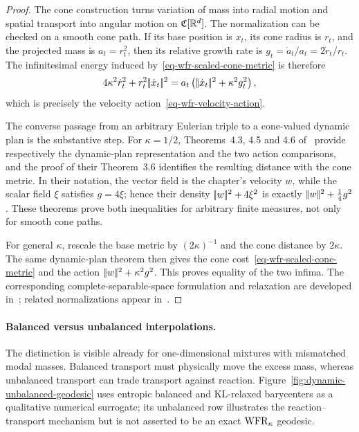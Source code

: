 \begin{proof}
	The cone construction turns variation of mass into radial motion and spatial transport into angular motion on $\mathfrak C[\mathbb{R}^d]$. The normalization can be checked on a smooth cone path. If its base position is $x_t$, its cone radius is $r_t$, and the projected mass is $a_t=r_t^2$, then its relative growth rate is $g_t=\dot a_t/a_t=2\dot r_t/r_t$. The infinitesimal energy induced by~\eqref{eq-wfr-scaled-cone-metric} is therefore
	\[
		4\kappa^2\dot r_t^2+r_t^2|\!| \dot x_t |\!|^2
		=
		a_t\left(|\!| \dot x_t |\!|^2+\kappa^2g_t^2\right),
	\]
		which is precisely the velocity action~\eqref{eq-wfr-velocity-action}.

	The converse passage from an arbitrary Eulerian triple to a cone-valued dynamic plan is the substantive step. For $\kappa=1/2$, Theorems~4.3, 4.5 and 4.6 of~\cite{LieroMielkeSavareShort} provide respectively the dynamic-plan representation and the two action comparisons, and the proof of their Theorem~3.6 identifies the resulting distance with the cone metric. In their notation, the vector field is the chapter's velocity $w$, while the scalar field $\xi$ satisfies $g=4\xi$; hence their density $|\!| w |\!|^2+4\xi^2$ is exactly $|\!| w |\!|^2+\tfrac14g^2$. These theorems prove both inequalities for arbitrary finite measures, not only for smooth cone paths.

	For general $\kappa$, rescale the base metric by $(2\kappa)^{-1}$ and the cone distance by $2\kappa$. The same dynamic-plan theorem then gives the cone cost~\eqref{eq-wfr-scaled-cone-metric} and the action $|\!| w |\!|^2+\kappa^2g^2$. This proves equality of the two infima. The corresponding complete-separable-space formulation and relaxation are developed in~\cite{LieroMielkeSavareLong}; related normalizations appear in~\cite{2017-chizat-focm,2015-chizat-unbalanced}.
\end{proof}

\paragraph{Balanced versus unbalanced interpolations.}
The distinction is visible already for one-dimensional mixtures with mismatched modal masses. Balanced transport must physically move the excess mass, whereas unbalanced transport can trade transport against reaction. Figure~\ref{fig:dynamic-unbalanced-geodesic} uses entropic balanced and KL-relaxed barycenters as a qualitative numerical surrogate; its unbalanced row illustrates the reaction--transport mechanism but is not asserted to be an exact $\operatorname{WFR}_\kappa$ geodesic.

